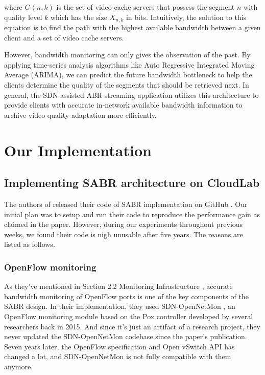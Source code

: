 \documentclass[12pt]{article}
\begin{document}
where $G(n,k)$ is the set of video cache servers that possess the segment $n$ with quality level $k$ which has the size $X_{n,k}$ in bits. Intuitively, the solution to this equation is to find the path with the highest available bandwidth between a given client and a set of video cache servers. 

However, bandwidth monitoring can only gives the observation of the past. By applying time-series analysis algorithms like Auto Regressive Integrated Moving Average (ARIMA), we can predict the future bandwidth bottleneck to help the clients determine the quality of the segments that should be retrieved next. In general, the SDN-assisted ABR streaming application utilizes this architecture to provide clients with accurate in-network available bandwidth information to archive video quality adaptation more efficiently.



\newpage
\section{Our Implementation}
\subsection{Implementing SABR architecture on CloudLab}

The authors of \cite{bhat_network_2017} released their code of SABR implementation on GitHub \cite{sabr_code}. Our initial plan was to setup and run their code to reproduce the performance gain as claimed in the paper. However, during our experiments throughout previous weeks, we found their code is nigh unusable after five years. The reasons are listed as follows.

\subsubsection{OpenFlow monitoring}
As they've mentioned in Section 2.2 Monitoring Infrastructure \cite{bhat_network_2017}, accurate bandwidth monitoring of OpenFlow ports is one of the key components of the SABR design. In their implementation, they used SDN-OpenNetMon \cite{openmon}, an OpenFlow monitoring module based on the Pox controller developed by several researchers back in 2015. And since it's just an artifact of a research project, they never updated the SDN-OpenNetMon codebase since the paper's publication. Seven years later, the OpenFlow specification and Open vSwitch API has changed a lot, and SDN-OpenNetMon is not fully compatible with them anymore. 
\end{document}
